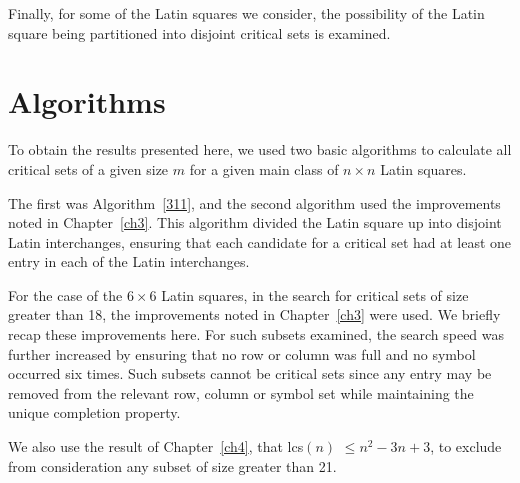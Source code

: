 \documentclass[12pt]{report}
\def\lcs#1{{\rm lcs}$(#1)$}
\begin{document}
Finally, for some of the Latin squares we consider, the possibility of the Latin
square being partitioned into disjoint critical sets is examined.

\vspace{5mm}

\section{Algorithms}

%
%
To obtain the results presented here, we used two basic algorithms 
to calculate all critical sets of a given size $m$ for a given main
class of $n \times n$ Latin squares.

The first was Algorithm~\ref{311}, and the second algorithm used the
improvements noted in Chapter~\ref{ch3}.  This algorithm divided the Latin
square up into disjoint Latin interchanges, ensuring that each candidate for
a critical set had at least one entry in each of the Latin interchanges.

For the case of the $6 \times 6$ Latin squares, in the search for critical
sets of size greater than 18, the improvements noted in Chapter~\ref{ch3} were
used.  We briefly recap these improvements here.  For such subsets examined,
the search speed was further increased by ensuring that 
no row or column was full and no symbol occurred six times.
Such subsets cannot be critical sets since any entry may be removed from
the relevant row, column or symbol set while maintaining the unique
completion property.

We also use the result of Chapter~\ref{ch4}, that \lcs{n} $\leq n^2-3n+3$, to
exclude from consideration any subset of size greater than 21.

\end{document}
